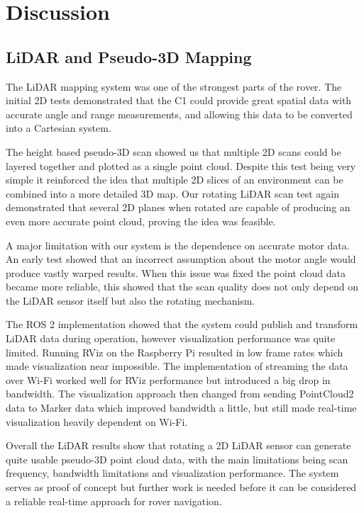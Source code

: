 \chapter{Discussion}

\section{LiDAR and Pseudo-3D Mapping}
The LiDAR mapping system was one of the strongest parts of the rover. The initial 2D tests demonstrated that the C1 could provide great spatial data with accurate angle
and range measurements, and allowing this data to be converted into a Cartesian system.

The height based pseudo-3D scan showed us that multiple 2D scans could be layered together and plotted as a single point cloud. 
Despite this test being very simple it reinforced the idea that multiple 2D slices of an environment can be combined into a more detailed 3D map.
Our rotating LiDAR scan test again demonstrated that several 2D planes when rotated are capable of producing an even more accurate point cloud, proving the idea was feasible.

A major limitation with our system is the dependence on accurate motor data. An early test showed that an incorrect assumption about the motor angle would produce vastly warped results. 
When this issue was fixed the point cloud data became more reliable, this showed that the scan quality does not only depend on the LiDAR sensor itself but also the rotating mechanism.

The ROS 2 implementation showed that the system could publish and transform LiDAR data during operation, however visualization performance was quite limited.
Running RViz on the Raspberry Pi resulted in low frame rates which made visualization near impossible. The implementation of streaming the 
data over Wi-Fi worked well for RViz performance but introduced a big drop in bandwidth.
The visualization approach then changed from sending PointCloud2 data to Marker data which improved bandwidth a little, but still made real-time visualization heavily dependent on Wi-Fi.

Overall the LiDAR results show that rotating a 2D LiDAR sensor can generate quite usable pseudo-3D point cloud data, with the main limitations being scan frequency, 
bandwidth limitations and visualization performance.
The system serves as proof of concept but further work is needed before it can be considered a reliable real-time approach for rover navigation.

